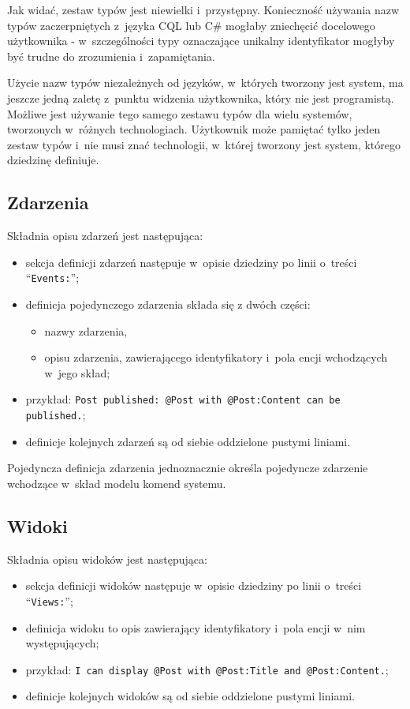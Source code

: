 Jak widać, zestaw typów jest niewielki i~przystępny.
Konieczność używania nazw typów zaczerpniętych z~języka CQL lub C\# mogłaby zniechęcić docelowego użytkownika - w~szczególności typy oznaczające unikalny identyfikator mogłyby być trudne do zrozumienia i~zapamiętania.

Użycie nazw typów niezależnych od języków, w~których tworzony jest system, ma jeszcze jedną zaletę z~punktu widzenia użytkownika, który nie jest programistą.
Możliwe jest używanie tego samego zestawu typów dla wielu systemów, tworzonych w~różnych technologiach.
Użytkownik może pamiętać tylko jeden zestaw typów i~nie musi znać technologii, w~której tworzony jest system, którego dziedzinę definiuje.


\subsection{Zdarzenia}

Składnia opisu zdarzeń jest następująca:

\begin{itemize}
 \item sekcja definicji zdarzeń następuje w~opisie dziedziny po linii o~treści ``\verb|Events:|'';
 \item definicja pojedynczego zdarzenia składa się z dwóch części:
  \begin{itemize}
   \item nazwy zdarzenia,
   \item opisu zdarzenia, zawierającego identyfikatory i~pola encji wchodzących w~jego skład;
  \end{itemize}
 \item przykład: \verb|Post published: @Post with @Post:Content can be published.|;
 \item definicje kolejnych zdarzeń są od siebie oddzielone pustymi liniami.
\end{itemize}

Pojedyncza definicja zdarzenia jednoznacznie określa pojedyncze zdarzenie wchodzące w~skład modelu komend systemu.


\subsection{Widoki}

Składnia opisu widoków jest następująca:

\begin{itemize}
 \item sekcja definicji widoków następuje w~opisie dziedziny po linii o~treści ``\verb|Views:|'';
 \item definicja widoku to opis zawierający identyfikatory i~pola encji w~nim występujących;
 \item przykład: \verb|I can display @Post with @Post:Title and @Post:Content.|;
 \item definicje kolejnych widoków są od siebie oddzielone pustymi liniami.
\end{itemize}

